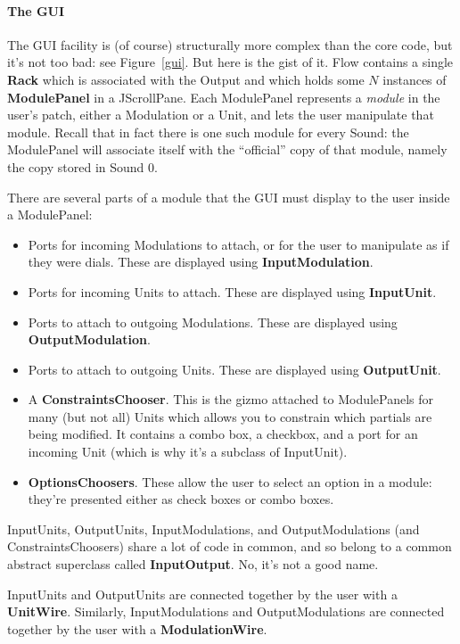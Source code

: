 \documentclass{article}
\newcommand\name{Flow}
\begin{document}
\paragraph{The GUI} The GUI facility is (of course) structurally more complex than the core code, but it's not too bad: see Figure~\ref{gui}.  But here is the gist of it.  {\name} contains a single {\bf Rack} which is associated with the Output and which holds some \(N\) instances of {\bf ModulePanel} in a JScrollPane.  Each ModulePanel represents a {\it module} in the user's patch, either a Modulation or a Unit, and lets the user manipulate that module.  Recall that in fact there is one such module for every Sound: the ModulePanel will associate itself with the ``official'' copy of that module, namely the copy stored in Sound 0.

There are several parts of a module that the GUI must display to the user inside a ModulePanel:

\begin{itemize}
\item Ports for incoming Modulations to attach, or for the user to manipulate as if they were dials.  These are displayed using {\bf InputModulation}.
\item Ports for incoming Units to attach.  These are displayed using {\bf InputUnit}.
\item Ports to attach to outgoing Modulations.  These are displayed using {\bf OutputModulation}.
\item Ports to attach to outgoing Units.  These are displayed using {\bf OutputUnit}.
\item A {\bf ConstraintsChooser}.  This is the gizmo attached to ModulePanels for many (but not all) Units which allows you to constrain which partials are being modified.  It contains a combo box, a checkbox, and a port for an incoming Unit (which is why it's a subclass of InputUnit).
\item {\bf OptionsChoosers}.  These allow the user to select an option in a module: they're presented either as check boxes or combo boxes.
\end{itemize}

InputUnits, OutputUnits, InputModulations, and OutputModulations (and ConstraintsChoosers) share a lot of code in common, and so belong to a common abstract superclass called {\bf InputOutput}.  No, it's not a good name.

InputUnits and OutputUnits are connected together by the user with a {\bf UnitWire}.  Similarly, InputModulations and OutputModulations are connected together by the user with a {\bf ModulationWire}.
\end{document}
